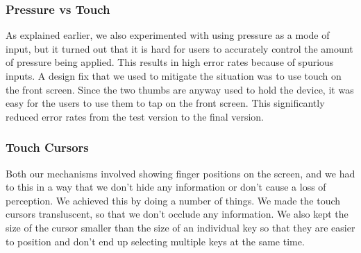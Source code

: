 \subsubsection{Pressure vs Touch}
As explained earlier, we also experimented with using pressure as a mode of input, but it turned out that it is hard for users to accurately control the amount of pressure being applied. This results in high error rates because of spurious inputs. A design fix that we used to mitigate the situation was to use touch on the front screen. Since the two thumbs are anyway used to hold the device, it was easy for the users to use them to tap on the front screen. This significantly reduced error rates from the test version to the final version.
\subsubsection{Touch Cursors}
Both our mechanisms involved showing finger positions on the screen, and we had to this in a way that we don't hide any information or don't cause a loss of perception. We achieved this by doing a number of things. We made the touch cursors transluscent, so that we don't occlude any information. We also kept the size of the cursor smaller than the size of an individual key so that they are easier to position and don't end up selecting multiple keys at the same time. 